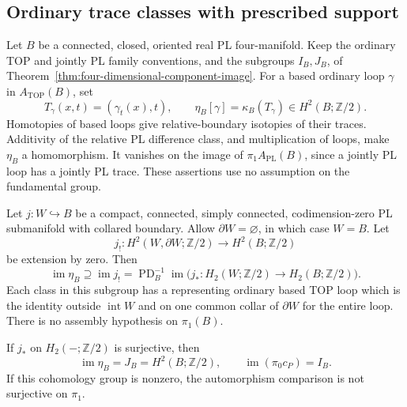 \subsection{Ordinary trace classes with prescribed support}

Let $B$ be a connected, closed, oriented real PL four-manifold.
Keep the ordinary TOP and jointly PL family conventions, and the
subgroups $I_B,J_B$, of
Theorem~\ref{thm:four-dimensional-component-image}.
For a based ordinary loop $\gamma$ in $A_{\mathrm{TOP}}(B)$, set
\[
 T_\gamma(x,t)=(\gamma_t(x),t),\qquad
 \eta_B[\gamma]=\kappa_B(T_\gamma)
                   \in H^2(B;\mathbb Z/2).
\]
Homotopies of based loops give relative-boundary isotopies of
their traces. Additivity of the relative PL difference class,
and multiplication of loops, make $\eta_B$ a homomorphism.
It vanishes on the image of $\pi_1A_{\mathrm{PL}}(B)$, since
a jointly PL loop has a jointly PL trace. These assertions use
no assumption on the fundamental group.

\begin{theorem}\label{thm:supported-four-dimensional-traces}
Let $j:W\hookrightarrow B$ be a compact, connected, simply
connected, codimension-zero PL submanifold with collared boundary.
Allow $\partial W=\varnothing$, in which case $W=B$.
Let
\[
 j_!:H^2(W,\partial W;\mathbb Z/2)
                       \longrightarrow H^2(B;\mathbb Z/2)
\]
be extension by zero. Then
\begin{equation}\label{eq:supported-four-trace-image}
 \operatorname{im}\eta_B\supseteq\operatorname{im}j_!
 =\operatorname{PD}_B^{-1}
   \operatorname{im}\bigl(j_*:H_2(W;\mathbb Z/2)
                                  \to H_2(B;\mathbb Z/2)\bigr).
\end{equation}
Each class in this subgroup has a representing ordinary based
TOP loop which is the identity outside $\operatorname{int}W$
and on one common collar of $\partial W$ for the entire loop.
There is no assembly hypothesis on $\pi_1(B)$.

If $j_*$ on $H_2(-;\mathbb Z/2)$ is surjective, then
\begin{equation}\label{eq:supported-four-component-image}
 \operatorname{im}\eta_B=J_B=H^2(B;\mathbb Z/2),
 \qquad \operatorname{im}(\pi_0c_P)=I_B.
\end{equation}
If this cohomology group is nonzero, the automorphism comparison
is not surjective on $\pi_1$.
\end{theorem}


